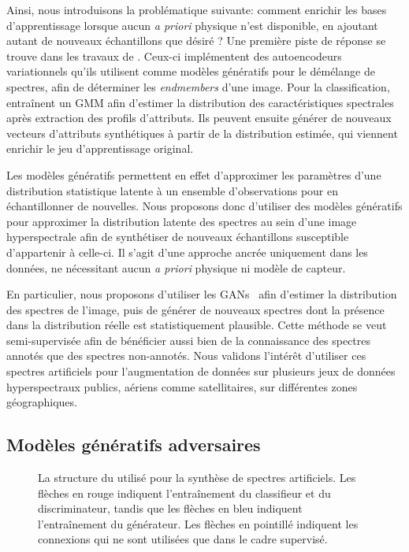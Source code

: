 Ainsi, nous introduisons la problématique suivante: comment enrichir les bases d'apprentissage lorsque aucun \emph{a priori} physique n'est disponible, en ajoutant autant de nouveaux échantillons que désiré ? Une première piste de réponse se trouve dans les travaux de \citet{gemp_inverting_2017}. Ceux-ci implémentent des autoencodeurs variationnels qu'ils utilisent comme modèles génératifs pour le démélange de spectres, afin de déterminer les \emph{endmembers} d'une image. Pour la classification,~\citet{davari_gmm-based_2018} entraînent un \gls{GMM} afin d'estimer la distribution des caractéristiques spectrales après extraction des profils d'attributs. Ils peuvent ensuite générer de nouveaux vecteurs d'attributs synthétiques à partir de la distribution estimée, qui viennent enrichir le jeu d'apprentissage original.

Les modèles génératifs permettent en effet d'approximer les paramètres d'une distribution statistique latente à un ensemble d'observations pour en échantillonner de nouvelles. Nous proposons donc d’utiliser des modèles génératifs pour approximer la distribution latente des spectres au sein d'une image hyperspectrale afin de synthétiser de nouveaux échantillons susceptible d'appartenir à celle-ci. Il s'agit d'une approche ancrée uniquement dans les données, ne nécessitant aucun \emph{a priori} physique ni modèle de capteur.

En particulier, nous proposons d'utiliser les \glspl{GAN}~\cite{goodfellow_generative_2014} afin d'estimer la distribution des spectres de l'image, puis de générer de nouveaux spectres dont la présence dans la distribution réelle est statistiquement plausible. Cette méthode se veut semi-supervisée afin de bénéficier aussi bien de la connaissance des spectres annotés que des spectres non-annotés. Nous validons l'intérêt d'utiliser ces spectres artificiels pour l'augmentation de données sur plusieurs jeux de données hyperspectraux publics, aériens comme satellitaires, sur différentes zones géographiques.

\subsection{Modèles génératifs adversaires}

\begin{figure}
		\resizebox{\textwidth}{!}{}
    \caption[La structure de  utilisée pour la synthèse de spectres artificiels.]{La structure du  utilisé pour la synthèse de spectres artificiels. Les flèches en \textcolor{BrickRed}{rouge} indiquent l'entraînement du classifieur et du discriminateur, tandis que les flèches en \textcolor{NavyBlue}{bleu} indiquent l'entraînement du générateur. Les flèches en pointillé indiquent les connexions qui ne sont utilisées que dans le cadre supervisé.}
    \label{fig:gan}
\end{figure}

